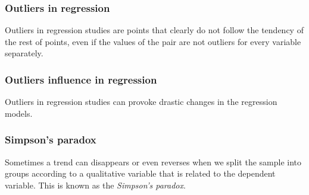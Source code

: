 \begin{frame}
\frametitle{Outliers in regression}
Outliers in regression studies are points that clearly do not follow the tendency of the rest of points, even if the values of the pair are not outliers for every variable separately.
\begin{center}
\resizebox{0.7\textwidth}{!}{}
\end{center}
\end{frame}


\begin{frame}
\frametitle{Outliers influence in regression}
Outliers in regression studies can provoke drastic changes in the regression models. 
\begin{center}
\resizebox{0.49\textwidth}{!}{}
\resizebox{0.49\textwidth}{!}{}
\end{center}
\end{frame}


\begin{frame}
\frametitle{Simpson's paradox}
Sometimes a trend can disappears or even reverses when we split the sample into groups according to a qualitative variable that is related to the dependent variable.
This is known as the \emph{Simpson's paradox}. 
\begin{center}
\resizebox{0.7\textwidth}{!}{}
\end{center}
\end{frame}




